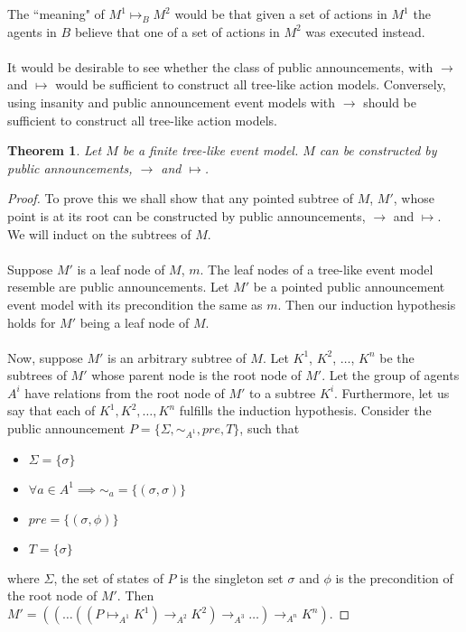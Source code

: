 \documentclass[12pt, a4paper, titlepage]{scrartcl}
\newtheorem{thm}{Theorem}
\begin{document}
The ``meaning" of $M^1 \mapsto_B M^2$ would be that given a set of actions in
$M^1$ the agents in $B$ believe that one of a set of actions in $M^2$ was
executed instead.\\
\\
It would be desirable to see whether the class of public announcements, with
$\to$ and $\mapsto$ would be sufficient to construct all tree-like action
models.
Conversely, using insanity and public announcement event models with $\to$ should be sufficient to construct
all tree-like action models.
\begin{thm}
Let $M$ be a finite tree-like event model.
$M$ can be constructed by public announcements, $\to$ and $\mapsto$.
\end{thm}
\begin{proof}
To prove this we shall show that any pointed subtree of $M$, $M'$, whose point
is at its root can be constructed by public announcements, $\to$ and $\mapsto$.
We will induct on the subtrees of $M$.\\
\\
Suppose $M'$ is a leaf node of $M$, $m$.
The leaf nodes of a tree-like event model resemble are public announcements.
Let $M'$ be a pointed public announcement event model with its precondition the
same as $m$.
Then our induction hypothesis holds for $M'$ being a leaf node of $M$.\\
\\
Now, suppose $M'$ is an arbitrary subtree of $M$.
Let $K^1$, $K^2$, $\ldots$, $K^n$ be the subtrees of $M'$ whose parent node is
the root node of $M'$.
Let the group of agents $A^i$ have relations from the root node of $M'$ to a
subtree $K^i$.
Furthermore, let us say that each of $K^1, K^2, \ldots, K^n$ fulfills the
induction hypothesis.
Consider the public announcement $P = \{\Sigma,\sim_{A^1},pre,T\}$, such that
\begin{itemize}
  \item $\Sigma = \{ \sigma \}$
  \item $\forall a \in A^1 \implies \sim_a = \{ (\sigma,\sigma) \}$
  \item $pre = \{ (\sigma, \phi)\}$
  \item $T = \{\sigma\}$
\end{itemize}
where $\Sigma$, the set of states of $P$ is the singleton set $\sigma$ and 
$\phi$ is the precondition of the root node of $M'$.
Then $M' = ((\ldots((P \mapsto_{A^1} K^1) \to_{A^2} K^2) \to_{A^3}
      \ldots)\to_{A^n} K^n)$.
\end{proof}
\end{document}
